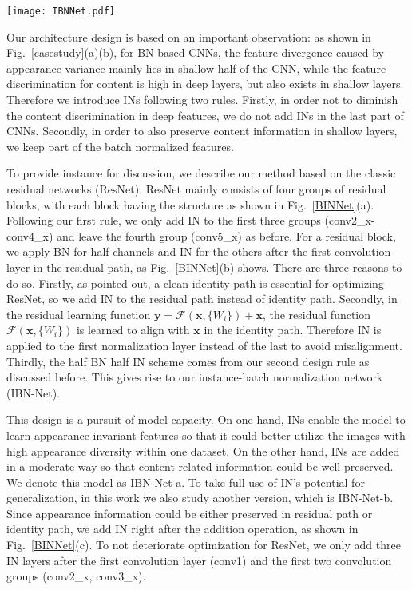 \documentclass[runningheads]{llncs}
\begin{document}
\begin{figure*}[!t]
\centering
\texttt{[image: IBNNet.pdf]}
\caption{\label{BINNet} Instance-batch normalization (IBN) block. }
\end{figure*}

Our architecture design is based on an important observation: as shown in Fig.~\ref{casestudy}(a)(b), for BN based CNNs, the feature divergence caused by appearance variance mainly lies in shallow half of the CNN, while the feature discrimination for content is high in deep layers, but also exists in shallow layers.
Therefore we introduce INs following two rules.
Firstly, in order not to diminish the content discrimination in deep features, we do not add INs in the last part of CNNs.
Secondly, in order to also preserve content information in shallow layers, we keep part of the batch normalized features.

To provide instance for discussion, we describe our method based on the classic residual networks (ResNet).
ResNet mainly consists of four groups of residual blocks, with each block having the structure as shown in Fig.~\ref{BINNet}(a).
Following our first rule, we only add IN to the first three groups (conv2\_x-conv4\_x) and leave the fourth group (conv5\_x) as before.
For a residual block, we apply BN for half channels and IN for the others after the first convolution layer in the residual path, as Fig.~\ref{BINNet}(b) shows.
There are three reasons to do so.
Firstly, as \cite{he2016identity} pointed out, a clean identity path is essential for optimizing ResNet, so we add IN to the residual path instead of identity path.
Secondly, in the residual learning function \(\mathbf{y}=\mathcal{F}(\mathbf{x},\{W_i\})+\mathbf{x}\), the residual function \(\mathcal{F}(\mathbf{x},\{W_i\})\) is learned to align with \(\mathbf{x}\) in the identity path. 
Therefore IN is applied to the first normalization layer instead of the last to avoid misalignment.
Thirdly, the half BN half IN scheme comes from our second design rule as discussed before.
This gives rise to our instance-batch normalization network (IBN-Net).


This design is a pursuit of model capacity. 
On one hand, INs enable the model to learn appearance invariant features so that it could better utilize the images with high appearance diversity within one dataset. 
On the other hand, INs are added in a moderate way so that content related information could be well preserved.
We denote this model as IBN-Net-a.
To take full use of IN's potential for generalization, in this work we also study another version, which is IBN-Net-b.
Since appearance information could be either preserved in residual path or identity path, we add IN right after the addition operation, as shown in Fig.~\ref{BINNet}(c).
To not deteriorate optimization for ResNet, we only add three IN layers after the first convolution layer (conv1) and the first two convolution groups (conv2\_x, conv3\_x).
\end{document}
